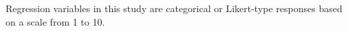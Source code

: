 \documentclass[review]{elsarticle}
\begin{document}
Regression variables in this study are categorical or Likert-type responses based on a scale from 1 to 10.
%
\end{document}
